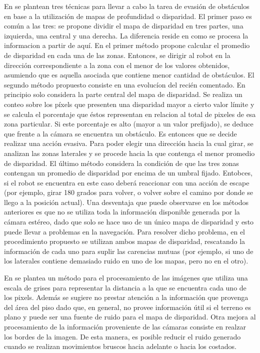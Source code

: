 \documentclass[journal]{IEEEtran}
\begin{document}
En \cite{KNG10} se plantean tres t\'ecnicas para llevar a cabo la tarea de evasi\'on de obst\'aculos en base a la utilizaci\'on de mapas de profundidad o disparidad. El primer paso es com\'un a las tres: se propone dividir el mapa de disparidad en tres partes, una izquierda, una central y una derecha. La diferencia reside en como se procesa la informacion a partir de aqu\'i. En el primer m\'etodo propone calcular el promedio de disparidad en cada una de las zonas. Entonces, se dirigir al robot en la direcci\'on correspondiente a la zona con el menor de los valores obtenidos, asumiendo que es aquella asociada que contiene menor cantidad de obst\'aculos. El segundo m\'etodo propuesto consiste en una evoluc\'ion del reci\'en comentado. En principio solo considera  la parte central del mapa de disparidad. Se realiza un conteo sobre los p\'ixels que presenten una disparidad mayor a cierto valor l\'imite y se calcula el porcentaje que \'estos representan en relacion al total de pixeles de esa zona particular. Si este porcentaje es alto (mayor a un valor prefijado), se deduce que frente a la c\'amara se encuentra un obst\'aculo.
Es entonces que se decide realizar una acci\'on evasiva. Para poder elegir una direcci\'on hacia la cual girar, se analizan las zonas laterales y se procede hacia la que contenga el menor promedio de disparidad. El \'ultimo m\'etodo considera la condici\'on de que las tres zonas contengan un promedio de disparidad por encima de un umbral fijado. Entobces, si el robot se encuentra en este caso deber\'a reaccionar con una acci\'on de escape (por ejemplo, girar 180 grados para volver, o volver sobre el camino por donde se llego a la posici\'on actual). Una desventaja que puede observarse en los m\'etodos anteriores es que no se utiliza toda la informaci\'on disponible generada por la c\'amara est\'ereo, dado que solo se hace uso de un \'unico mapa de disparidad y esto puede llevar a problemas en la navegaci\'on. Para resolver dicho problema, en el procedimiento propuesto se utilizan ambos mapas de disparidad, rescatando la informaci\'on de cada uno para suplir las carencias mutuas (por ejemplo, si uno de los laterales contiene demasiado ruido en uno de los mapas, pero no en el otro).

En \cite{RH04} se plantea un m\'etodo para el procesamiento de las im\'agenes que utiliza una escala de grises para representar la distancia a la que se encuentra cada uno de los pixels. Adem\'as se sugiere no prestar atenci\'on a la informaci\'on que provenga del \'area del piso dado que, en general, no provee informaci\'on \'util si el terreno es plano y puede ser una fuente de ruido para el mapa de disparidad. Otra mejora al procesamiento de la informaci\'on proveniente de las c\'amaras consiste en realzar los bordes de la imagen. De esta manera, es posible reducir el ruido generado cuando se realizan movimientos bruscos hacia adelante o hacia los costados.
\end{document}
